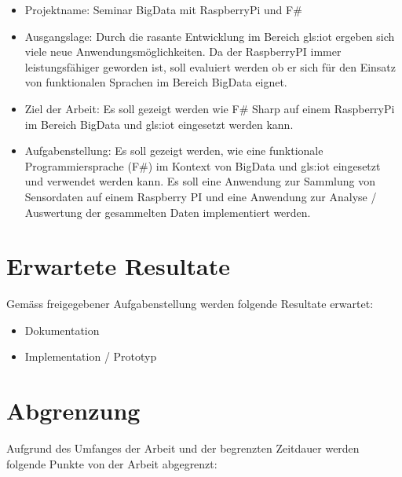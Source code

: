 \begin{itemize}
\item Projektname: Seminar BigData mit RaspberryPi und F\#
\item Ausgangslage: Durch die rasante Entwicklung im Bereich \Gls{gls:iot} ergeben sich viele neue Anwendungsmöglichkeiten. Da der RaspberryPI immer leistungsfähiger geworden ist, soll evaluiert werden ob er sich für den Einsatz von funktionalen Sprachen im Bereich BigData eignet.
\item Ziel der Arbeit: Es soll gezeigt werden wie F\# Sharp auf einem RaspberryPi im Bereich BigData und \Gls{gls:iot} eingesetzt werden kann.
\item Aufgabenstellung: Es soll gezeigt werden, wie eine funktionale Programmiersprache (F\#) im Kontext von BigData und \Gls{gls:iot} eingesetzt und verwendet werden kann. Es soll eine Anwendung zur Sammlung von Sensordaten auf einem Raspberry PI und eine Anwendung zur Analyse / Auswertung der gesammelten Daten implementiert werden.
\end{itemize}


\section{Erwartete Resultate} \label{sec:ErwarteteResultate}
Gemäss freigegebener Aufgabenstellung werden folgende Resultate erwartet:

\begin{itemize}
\item Dokumentation
\item Implementation / Prototyp
\end{itemize}


\section{Abgrenzung} \label{sec:Abgrenzung}
Aufgrund des Umfanges der Arbeit und der begrenzten Zeitdauer werden folgende Punkte von der Arbeit abgegrenzt:

\begin{itemize}

\end{itemize}

